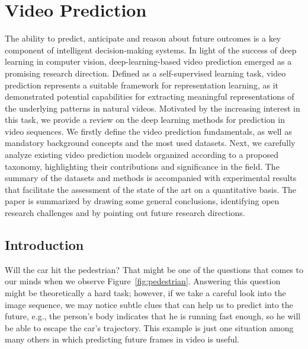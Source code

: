 \chapter{Video Prediction}
\label{cha:videoprediction}

\begin{chapterabstract}
The ability to predict, anticipate and reason about future outcomes is a key component of intelligent decision-making systems. In light of the success of deep learning in computer vision, deep-learning-based video prediction emerged as a promising research direction. Defined as a self-supervised learning task, video prediction represents a suitable framework for representation learning, as it demonstrated potential capabilities for extracting meaningful representations of the underlying patterns in natural videos. Motivated by the increasing interest in this task, we provide a review on the deep learning methods for prediction in video sequences. We firstly define the video prediction fundamentals, as well as mandatory background concepts and the most used datasets. Next, we carefully analyze existing video prediction models organized according to a proposed taxonomy, highlighting their contributions and significance in the field. The summary of the datasets and methods is accompanied with experimental results that facilitate the assessment of the state of the art on a quantitative basis. The paper is summarized by drawing some general conclusions, identifying open research challenges and by pointing out future research directions.
\end{chapterabstract}

\minitoc

\clearpage

\section{Introduction}
\label{cha:videoprediction:sec:introduction}

Will the car hit the pedestrian? That might be one of the questions that comes to our minds when we observe Figure~\ref{fig:pedestrian}. Answering this question might be theoretically a hard task; however, if we take a careful look into the image sequence, we may notice subtle clues that can help us to predict into the future, e.g., the person's body indicates that he is running fast enough, so he will be able to escape the car's trajectory. This example is just one situation among many others in which predicting future frames in video is useful.

